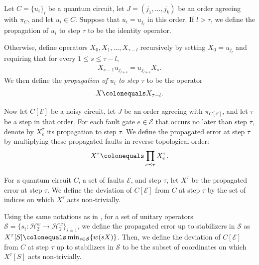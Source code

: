 \begin{definition}
  Let $C=\{u_i\}_i$ be a quantum circuit, let $J=(j_1,\ldots,j_k)$ be an order agreeing with $\pi_C$, and let $u_i\in C$. Suppose that $u_i=u_{j_l}$ in this order. If $l>\tau$, we define the propagation of $u_i$ to step $\tau$ to be the identity operator.

  Otherwise, define operators $X_0,X_1,\ldots,X_{\tau-l}$ recursively by setting $X_0=u_{j_l}$ and requiring that for every $1\le s\le \tau-l$,
  \begin{equation*}
    \begin{split}
      X_{s-1}u_{j_{l+s}} = u_{j_{l+s}}X_s.
    \end{split}
  \end{equation*}
  We then define the \emph{propagation of $u_i$ to step $\tau$} to be the operator
  \begin{equation*}
    \begin{split}
      X \colonequals X_{\tau-l}.
    \end{split}
  \end{equation*}

  Now let $C[\mathcal{E}]$ be a noisy circuit, let $J$ be an order agreeing with $\pi_{C[\mathcal{E}]}$, and let $\tau$ be a step in that order. For each fault gate $e\in\mathcal{E}$ that occurs no later than step $\tau$, denote by $X^{\tau}_{e}$ its propagation to step $\tau$. We define the propagated error at step $\tau$ by multiplying these propagated faults in reverse topological order:
  \begin{equation*}
    \begin{split}
      X^{\tau} \colonequals \prod_{e\preceq \tau} X^{\tau}_{e}.
    \end{split}
  \end{equation*}
\end{definition}


\begin{definition}[Deviation]
  \label{def:deviation}
  For a quantum circuit $C$, a set of faults $\mathcal{E}$, and step $\tau$, let $X^{\tau}$ be the propagated error at step $\tau$. We define the deviation of $C[\mathcal{E}]$ from $C$ at step $\tau$ by the set of indices on which $X^{\tau}$ acts non-trivially. 
\end{definition}
\begin{definition}
  Using the same notations as in , for a set of unitary operators $\mathcal{S} = \{s_{i} \colon \mathcal{H}_{2}^{w} \rightarrow \mathcal{H}_{2}^{w} \}_{i=1}$, we define the propagated error up to stabilizers in $\mathcal{S}$ as $X^{\tau}[S] \colonequals \min_{s \in \mathcal{S}} \{ w(sX) \}$. Then, we define the deviation of $C[\mathcal{E}]$ from $C$ at step $\tau$ up to stabilizers in $\mathcal{S}$ to be the subset of coordinates on which $X^{\tau}[S]$ acts non-trivially.
\end{definition}

